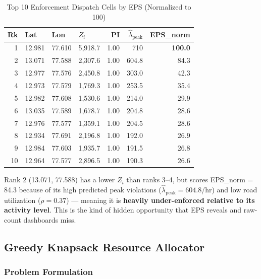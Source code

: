 \documentclass[12pt,a4paper]{article}
\begin{document}
\begin{table}[H]
\centering
\caption{Top 10 Enforcement Dispatch Cells by EPS (Normalized to 100)}
\begin{tabular}{rlllrrr}
\toprule
\textbf{Rk} & \textbf{Lat} & \textbf{Lon} & \textbf{$Z_i$} & \textbf{PI} & \textbf{$\hat{\lambda}_\text{peak}$} & \textbf{EPS\_norm} \\
\midrule
\rowcolor{alertred!10} 1 & 12.981 & 77.610 & 5,918.7 & 1.00 & 710 & \textbf{100.0} \\
\rowcolor{alertred!8} 2 & 13.071 & 77.588 & 2,307.6 & 1.00 & 604.8 & 84.3 \\
3 & 12.977 & 77.576 & 2,450.8 & 1.00 & 303.0 & 42.3 \\
4 & 12.973 & 77.579 & 1,769.3 & 1.00 & 253.5 & 35.4 \\
5 & 12.982 & 77.608 & 1,530.6 & 1.00 & 214.0 & 29.9 \\
6 & 13.035 & 77.589 & 1,678.7 & 1.00 & 204.8 & 28.6 \\
7 & 12.976 & 77.577 & 1,359.1 & 1.00 & 204.5 & 28.6 \\
8 & 12.934 & 77.691 & 2,196.8 & 1.00 & 192.0 & 26.9 \\
9 & 12.984 & 77.603 & 1,935.7 & 1.00 & 191.5 & 26.8 \\
10 & 12.964 & 77.577 & 2,896.5 & 1.00 & 190.3 & 26.6 \\
\bottomrule
\end{tabular}
\end{table}

\begin{tcolorbox}[warnbox, title={EPS Counterintuitive Example}]
Rank 2 (13.071, 77.588) has a lower $Z_i$ than ranks 3--4, but scores EPS\_norm = 84.3 because of its high predicted peak violations ($\hat{\lambda}_\text{peak} = 604.8$/hr) and low road utilization ($\rho = 0.37$) — meaning it is \textbf{heavily under-enforced relative to its activity level}. This is the kind of hidden opportunity that EPS reveals and raw-count dashboards miss.
\end{tcolorbox}

\subsection{Greedy Knapsack Resource Allocator}

\subsubsection{Problem Formulation}
\end{document}
